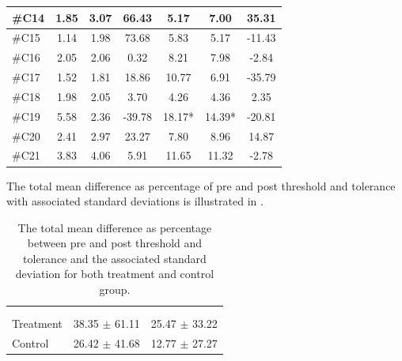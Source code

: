 \begin{longtable} {l|c|c|c|c|c|c}
\#C14 & 1.85 & 3.07 & 	66.43	 & 5.17 & 7.00 & 35.31 \\ \hline
\#C15 & 1.14 & 1.98 & 	73.68 & 5.83 & 5.17 & -11.43 \\ \hline
\#C16 & 2.05 & 2.06 & 	0.32 & 8.21 & 7.98 & -2.84 \\ \hline
\#C17 & 1.52 & 1.81 &	18.86 & 10.77 & 6.91 & -35.79 \\ \hline
\#C18 & 1.98 & 2.05 & 	3.70 & 4.26  &  4.36 & 2.35 \\ \hline
\#C19 & 5.58 & 2.36 & 	-39.78 & 18.17* & 14.39* & -20.81 \\ \hline
\#C20 & 2.41 & 2.97 &  23.27 & 7.80 &  8.96 & 14.87\\ \hline
\#C21 & 3.83 & 4.06 & 5.91  & 11.65 & 11.32 & -2.78 \\ \hline
\end{longtable}


The total mean difference as percentage of pre and post threshold and tolerance with associated standard deviations is illustrated in .


\begin{longtable} {l|c|c}
	\caption{The total mean difference as percentage between pre and post threshold and tolerance and the associated standard deviation for both treatment and control group.}
	\label{tab:Total} \\
\cellcolor[HTML]{C0C0C0} {} & 
\cellcolor[HTML]{C0C0C0}{\textbf{Threshold}} &  \cellcolor[HTML]{C0C0C0}{\textbf{Tolerance}}  	\\  \rule{0pt}{3ex} 		
\cellcolor[HTML]{C0C0C0}{} &
 \cellcolor[HTML]{C0C0C0}{Difference [\%]} &  \cellcolor[HTML]{C0C0C0}{Difference [\%]} \\ \hline
Treatment & 38.35 $\pm$ 61.11 & 25.47 $\pm$ 33.22 \\ \hline
Control & 26.42 $\pm$ 41.68 & 12.77 $\pm$ 27.27 \\ \hline
\end{longtable}
\vspace{-.5cm}


